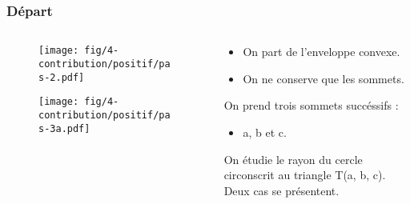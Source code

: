\begin{frame}
  \frametitle{Départ}
\begin{columns}[t]
    \begin{column}{7cm}
      {
        \begin{figure}[h!]
          \centering
          \texttt{[image: fig/4-contribution/positif/pas-2.pdf]}
        \end{figure}
      }
      {
        \begin{figure}[h!]
          \centering
          \texttt{[image: fig/4-contribution/positif/pas-3a.pdf]}
        \end{figure}
      }      
    \end{column}
    \begin{column}{3cm}
      \begin{block}{}
        {
			 		\begin{itemize}
						\item On part de l'enveloppe convexe.
						\item On ne conserve que les sommets.
					\end{itemize}
				}
        {
          On prend trois sommets succéssifs :
			 		\begin{itemize}
						\item a, b et c.
					\end{itemize}
          On étudie le rayon du cercle circonscrit au triangle T(a, b, c).\\
					\alert{Deux cas se présentent.}
        }
      \end{block}  
    \end{column}
  \end{columns}
\end{frame}



